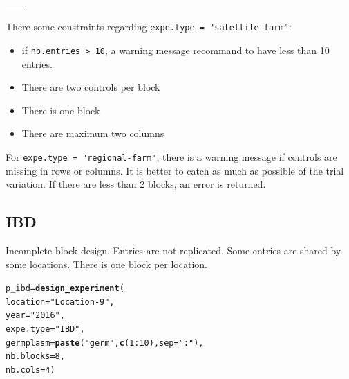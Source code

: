 \documentclass{book}\usepackage[]{graphicx}\usepackage[]{color}
\makeatletter
\newcommand{\hlnum}[1]{\textcolor[rgb]{0.686,0.059,0.569}{#1}}%
\newcommand{\hlstr}[1]{\textcolor[rgb]{0.192,0.494,0.8}{#1}}%
\newcommand{\hlopt}[1]{\textcolor[rgb]{0,0,0}{#1}}%
\newcommand{\hlstd}[1]{\textcolor[rgb]{0.345,0.345,0.345}{#1}}%
\newcommand{\hlkwb}[1]{\textcolor[rgb]{0.69,0.353,0.396}{#1}}%
\newcommand{\hlkwc}[1]{\textcolor[rgb]{0.333,0.667,0.333}{#1}}%
\newcommand{\hlkwd}[1]{\textcolor[rgb]{0.737,0.353,0.396}{\textbf{#1}}}%
\newenvironment{kframe}{%
 \def\at@end@of@kframe{}%
 \ifinner\ifhmode%
  \def\at@end@of@kframe{\end{minipage}}%
  \begin{minipage}{\columnwidth}%
 \fi\fi%
 \def\FrameCommand##1{\hskip\@totalleftmargin \hskip-\fboxsep
 \colorbox{shadecolor}{##1}\hskip-\fboxsep
     \hskip-\linewidth \hskip-\@totalleftmargin \hskip\columnwidth}%
 \MakeFramed {\advance\hsize-\width
   \@totalleftmargin\z@ \linewidth\hsize
   \@setminipage}}%
 {\par\unskip\endMakeFramed%
 \at@end@of@kframe}
\newenvironment{knitrout}{}{} %
\makeatother
\begin{document}
\begin{center}
\begin{tabular}{cc}
\begin{knitrout}
{}



\end{knitrout}
\\
\end{tabular}
\end{center}

There some constraints regarding \texttt{expe.type = "satellite-farm"}:
\begin{itemize}
\item if \texttt{nb.entries > 10}, a warning message recommand to have less than 10 entries.
\item There are two controls per block
\item There is one block
\item There are maximum two columns
\end{itemize}

For \texttt{expe.type = "regional-farm"}, there is a warning message if controls are missing in rows or columns.
It is better to catch as much as possible of the trial variation.
If there are less than 2 blocks, an error is returned.

\subsection{IBD}
\label{ibd}

Incomplete block design.
Entries are not replicated. Some entries are shared by some locations.
There is one block per location.

\begin{knitrout}
\color{fgcolor}\begin{kframe}
\begin{alltt}
\hlstd{p_ibd} \hlkwb{=} \hlkwd{design_experiment}\hlstd{(}
  \hlkwc{location} \hlstd{=} \hlstr{"Location-9"}\hlstd{,}
  \hlkwc{year} \hlstd{=} \hlstr{"2016"}\hlstd{,}
  \hlkwc{expe.type} \hlstd{=} \hlstr{"IBD"}\hlstd{,}
  \hlkwc{germplasm} \hlstd{=} \hlkwd{paste}\hlstd{(}\hlstr{"germ"}\hlstd{,} \hlkwd{c}\hlstd{(}\hlnum{1}\hlopt{:}\hlnum{10}\hlstd{),} \hlkwc{sep} \hlstd{=} \hlstr{":"}\hlstd{),}
  \hlkwc{nb.blocks} \hlstd{=} \hlnum{8}\hlstd{,}
  \hlkwc{nb.cols} \hlstd{=} \hlnum{4}\hlstd{)}
\end{alltt}
\end{kframe}
\end{knitrout}
\end{document}
